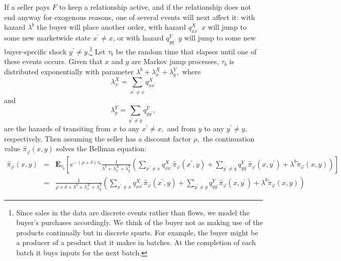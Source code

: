 \documentclass[12pt]{article}
\begin{document}
If a seller pays $F$ to keep a relationship active, and if the relationship
does not end anyway for exogenous reasons, one of several events will next
affect it: with hazard $\lambda ^{b}$ the buyer will place another order,
with hazard $q_{xx^{\prime }}^{X}$ $x$ will jump to some new marketwide
state $x^{\prime }\neq x$, or with hazard $q_{yy^{\prime }}^{Y}$ $y$ will
jump to some new buyer-specific shock $y^{\prime }\neq y$.\footnote{%
Since sales in the data are discrete events rather than flows, we model the
buyer's purchases accordingly. We think of the buyer not as making use of
the products continually but in discrete spurts. For example, the buyer
might be a producer of a product that it makes in batches. At the completion
of each batch it buys inputs for the next batch.\medskip} Let $\tau _{b}$ be
the random time that elapses until one of these events occurs. Given that $x$
and $y$ are Markov jump processes, $\tau _{b}$ is distributed exponentially
with parameter $\lambda ^{b}+\lambda _{x}^{X}+\lambda _{y}^{Y}, $ where%
\begin{equation}
\lambda _{x}^{X}=\sum_{x^{\prime }\neq x}q_{xx^{\prime }}^{X}  \label{q_K}
\end{equation}%
and%
\begin{equation}
\lambda _{y}^{Y}=\sum_{y^{\prime }\neq y}q_{yy^{\prime }}^{Y},  \label{q_Y}
\end{equation}%
are the hazards of transiting from $x$ to any $x^{\prime }\neq x,$ and from $%
y$ to any $y^{\prime }\neq y,$ respectively. Then assuming the seller has a
discount factor $\rho ,$ the continuation value $\widehat{\pi }_{\varphi
}(x,y)$ solves the Bellman equation:%
\begin{eqnarray*}
\widehat{\pi }_{\varphi }(x,y) &=&\mathbf{E}_{\tau _{b}}\left[ e^{-(\rho
+\delta )\tau _{b}}\frac{1}{\lambda ^{b}+\lambda _{x}^{X}+\lambda _{y}^{Y}}%
\left( \sum_{x^{\prime }\neq x}q_{xx^{\prime }}^{X}\widehat{\pi }_{\varphi
}(x^{\prime },y)+\sum_{y^{\prime }\neq y}q_{yy^{\prime }}^{Y}\widehat{\pi }%
_{\varphi }(x,y^{\prime })+\lambda ^{b}\widetilde{\pi }_{\varphi
}(x,y)\right) \right] \\
&=&\frac{1}{\rho +\delta +\lambda ^{b}+\lambda _{x}^{X}+\lambda _{y}^{Y}}%
\left( \sum_{x^{\prime }\neq x}q_{xx^{\prime }}^{X}\widehat{\pi }_{\varphi
}(x^{\prime },y)+\sum_{y^{\prime }\neq y}q_{yy^{\prime }}^{Y}\widehat{\pi }%
_{\varphi }(x,y^{\prime })+\lambda ^{b}\widetilde{\pi }_{\varphi
}(x,y)\right)
\end{eqnarray*}
\end{document}
